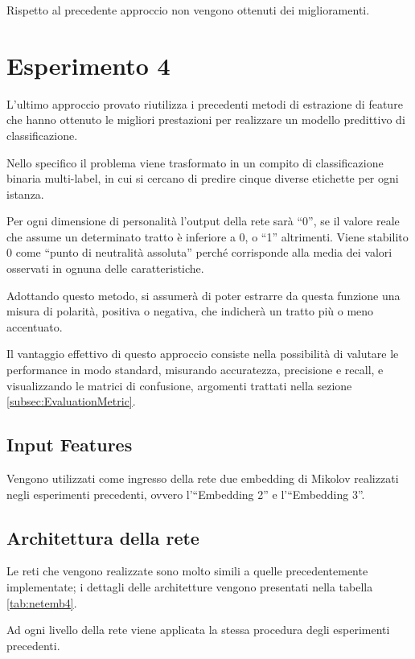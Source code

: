 Rispetto al precedente approccio non vengono ottenuti dei miglioramenti. 

\section{Esperimento 4}
\label{sec:es4}

L'ultimo approccio provato riutilizza i precedenti metodi di estrazione di feature che hanno ottenuto le migliori prestazioni per realizzare un modello predittivo di classificazione.

Nello specifico il problema viene trasformato in un compito di classificazione binaria multi-label, in cui si cercano di predire cinque diverse etichette per ogni istanza. 

Per ogni dimensione di personalità l'output della rete sarà ``0'', se il valore reale che assume un determinato tratto è inferiore a 0, o ``1'' altrimenti.
Viene stabilito 0 come ``punto di neutralità assoluta'' perché corrisponde alla media dei valori osservati in ognuna delle caratteristiche.

Adottando questo metodo, si assumerà di poter estrarre da questa funzione una misura di polarità, positiva o negativa, che indicherà un tratto più o meno accentuato.

Il vantaggio effettivo di questo approccio consiste nella possibilità di valutare le performance in modo standard, misurando accuratezza, precisione e recall, e visualizzando le matrici di confusione, argomenti trattati nella sezione \ref{subsec:EvaluationMetric}.

\subsection{Input Features}
\label{subsec:features4}

Vengono utilizzati come ingresso della rete due embedding di Mikolov realizzati negli esperimenti precedenti, ovvero l'``Embedding 2'' e l'``Embedding 3''.

\subsection{Architettura della rete}
\label{subsec:modelli4}

Le reti che vengono realizzate sono molto simili a quelle precedentemente implementate; i dettagli delle architetture vengono presentati nella tabella \ref{tab:netemb4}.

Ad ogni livello della rete viene applicata la stessa procedura degli esperimenti precedenti. 

